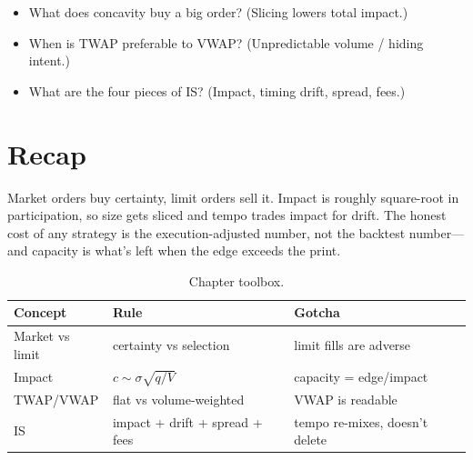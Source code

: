 \begin{checkpoint}
\begin{itemize}
\item What does concavity buy a big order? (Slicing lowers total impact.)
\item When is TWAP preferable to VWAP? (Unpredictable volume / hiding intent.)
\item What are the four pieces of IS? (Impact, timing drift, spread, fees.)
\end{itemize}
\end{checkpoint}

\section{Recap}\label{sec:execrecap}

Market orders buy certainty, limit orders sell it. Impact is roughly square-root in
participation, so size gets sliced and tempo trades impact for drift. The honest cost of
any strategy is the execution-adjusted number, not the backtest number---and capacity is
what's left when the edge exceeds the print.

\begin{table}[htbp]\centering\small
\caption{Chapter toolbox.}
\begin{tabular}{@{}lll@{}}
\toprule
Concept & Rule & Gotcha\\
\midrule
Market vs limit & certainty vs selection & limit fills are adverse\\
Impact & $c\sim\sigma\sqrt{q/V}$ & capacity = edge/impact\\
TWAP/VWAP & flat vs volume-weighted & VWAP is readable\\
IS & impact + drift + spread + fees & tempo re-mixes, doesn't delete\\
\bottomrule
\end{tabular}
\end{table}

